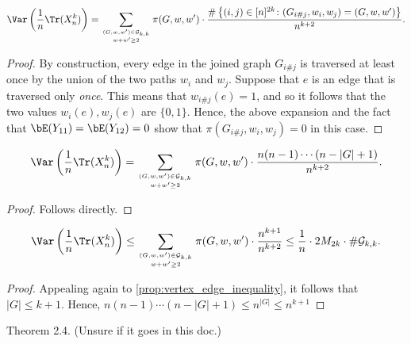 \begin{proposition}
  \label{prop:var_trace_as_sum}
  \notready
  \[ \Var\left( \frac1n\Tr(X_n^k)\right) = \sum_{(G,w,w')\in \mathcal{G}_{k,k}\atop w+w'\ge 2} \pi(G,w,w')\cdot\frac{\#\left\{(i,{j})\in [n]^{2k}\colon (G_{i\#j},w_{i},w_{j}) = (G,w,w')\right\}}{n^{k+2}}. \]
\end{proposition}

\begin{proof}
  \notready
  By construction, every edge in the joined graph $G_{{i}\#{j}}$ is traversed at least once by the union of the two paths $w_{i}$ and $w_{j}$.  Suppose that $e$ is an edge that is traversed only {\em once}.  This means that $w_{{i}\#{j}}(e) = 1$, and so it follows that the two values $w_{i}(e),w_{j}(e)$ are $\{0,1\}$.  Hence, the above expansion and the fact that $\bE(Y_{11})=\bE(Y_{12})=0$ show that $\pi(G_{{i}\#{j}},w_{i},w_{j}) = 0$ in this case.
\end{proof}


\begin{lemma}
  \label{lem:simplified_var_trace_as_sum}
  \notready
  \[ \Var\left( \frac1n\Tr({X}_n^k)\right) = \sum_{(G,w,w')\in \mathcal{G}_{k,k}\atop w+w'\ge 2} \pi(G,w,w')\cdot\frac{n(n-1)\cdots (n-|G|+1)}{n^{k+2}}. \]
\end{lemma}

\begin{proof}
  \notready
  Follows directly.
\end{proof}


\begin{proposition}
  \label{prop:var_upper_bound}
  \notready
  \[ \Var\left( \frac1n\Tr({X}_n^k)\right) \le \sum_{(G,w,w')\in\mathcal{G}_{k,k}\atop w+w'\ge 2} \pi(G,w,w')\cdot \frac{n^{k+1}}{n^{k+2}} \le \frac1n\cdot 2M_{2k}\cdot \#\mathcal{G}_{k,k}. \]
\end{proposition}

\begin{proof}
  \notready
  Appealing again to \ref{prop:vertex_edge_inequality}, it follows that $|G|\le k+1$.  Hence, $n(n-1)\cdots(n-|G|+1) \le n^{|G|} \le n^{k+1}$
\end{proof}


\begin{theorem}
  \label{thm:wigner_law_matrix_moments}
  \notready
  Theorem 2.4. (Unsure if it goes in this doc.)
\end{theorem}


